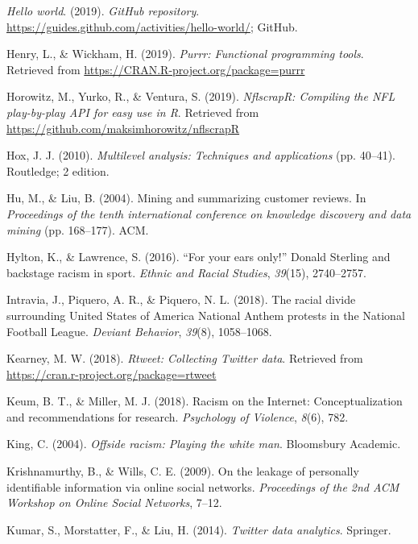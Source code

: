 \documentclass[12pt,twoside]{reedthesis}
\begin{document}
\hypertarget{ref-github}{}
\emph{Hello world}. (2019). \emph{GitHub repository}.
\url{https://guides.github.com/activities/hello-world/}; GitHub.

\hypertarget{ref-purrr}{}
Henry, L., \& Wickham, H. (2019). \emph{Purrr: Functional programming
tools}. Retrieved from \url{https://CRAN.R-project.org/package=purrr}

\hypertarget{ref-nflscrapr}{}
Horowitz, M., Yurko, R., \& Ventura, S. (2019). \emph{NflscrapR:
Compiling the NFL play-by-play API for easy use in R}. Retrieved from
\url{https://github.com/maksimhorowitz/nflscrapR}

\hypertarget{ref-hox2010multilevel}{}
Hox, J. J. (2010). \emph{Multilevel analysis: Techniques and
applications} (pp. 40--41). Routledge; 2 edition.

\hypertarget{ref-hu2004mining}{}
Hu, M., \& Liu, B. (2004). Mining and summarizing customer reviews. In
\emph{Proceedings of the tenth international conference on knowledge
discovery and data mining} (pp. 168--177). ACM.

\hypertarget{ref-hylton2016your}{}
Hylton, K., \& Lawrence, S. (2016). ``For your ears only!'' Donald
Sterling and backstage racism in sport. \emph{Ethnic and Racial
Studies}, \emph{39}(15), 2740--2757.

\hypertarget{ref-intravia2018racial}{}
Intravia, J., Piquero, A. R., \& Piquero, N. L. (2018). The racial
divide surrounding United States of America National Anthem protests in
the National Football League. \emph{Deviant Behavior}, \emph{39}(8),
1058--1068.

\hypertarget{ref-rtweet-package}{}
Kearney, M. W. (2018). \emph{Rtweet: Collecting Twitter data}. Retrieved
from \url{https://cran.r-project.org/package=rtweet}

\hypertarget{ref-keum2018racism}{}
Keum, B. T., \& Miller, M. J. (2018). Racism on the Internet:
Conceptualization and recommendations for research. \emph{Psychology of
Violence}, \emph{8}(6), 782.

\hypertarget{ref-king2004offside}{}
King, C. (2004). \emph{Offside racism: Playing the white man}.
Bloomsbury Academic.

\hypertarget{ref-krishnamurthy2009leakage}{}
Krishnamurthy, B., \& Wills, C. E. (2009). On the leakage of personally
identifiable information via online social networks. \emph{Proceedings
of the 2nd ACM Workshop on Online Social Networks}, 7--12.

\hypertarget{ref-kumar2014twitter}{}
Kumar, S., Morstatter, F., \& Liu, H. (2014). \emph{Twitter data
analytics}. Springer.
\end{document}
